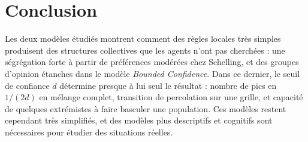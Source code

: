 \documentclass[11pt,a4paper]{article}
\begin{document}
\section*{Conclusion}

Les deux modèles étudiés montrent comment des règles locales très simples produisent des
structures collectives que les agents n'ont pas cherchées : une ségrégation forte à partir
de préférences modérées chez Schelling, et des groupes d'opinion étanches dans le modèle
\textit{Bounded Confidence}. Dans ce dernier, le seuil de confiance $d$ détermine presque à
lui seul le résultat : nombre de pics en $1/(2d)$ en mélange complet, transition de percolation
sur une grille, et capacité de quelques extrémistes à faire basculer une population. Ces
modèles restent cependant très simplifiés, et des modèles plus descriptifs et cognitifs sont
nécessaires pour étudier des situations réelles.
\end{document}
